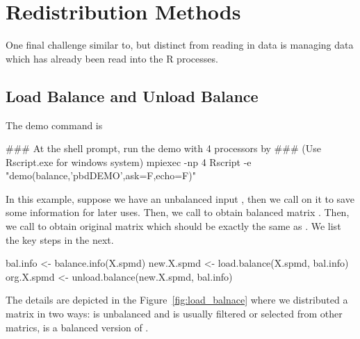 \chapter{Redistribution Methods}
\label{sec:redist}

One final challenge similar to, but distinct from reading in data is managing data which has already been read into the R processes.

\section[Load Balance and Unload Balance]{Load Balance and Unload Balance}
\label{sec:lb_ub}

The demo command is
\begin{Command}
### At the shell prompt, run the demo with 4 processors by
### (Use Rscript.exe for windows system)
mpiexec -np 4 Rscript -e "demo(balance,'pbdDEMO',ask=F,echo=F)"
\end{Command}
In this example, suppose we have an unbalanced input ,
then we call  on it to save some information for later uses.
Then, we call  to obtain balanced matrix
.
Then, we call  to obtain original matrix
 which should be exactly the same as .
We list the key steps in the next.
\begin{Code}[title=R Code]
bal.info <- balance.info(X.spmd)
new.X.spmd <- load.balance(X.spmd, bal.info)
org.X.spmd <- unload.balance(new.X.spmd, bal.info)
\end{Code}
The details are depicted in the Figure~\ref{fig:load_balnace}
where we distributed a matrix in two ways:
 is unbalanced and is usually filtered or
selected from other matrics,
 is a balanced version of .

